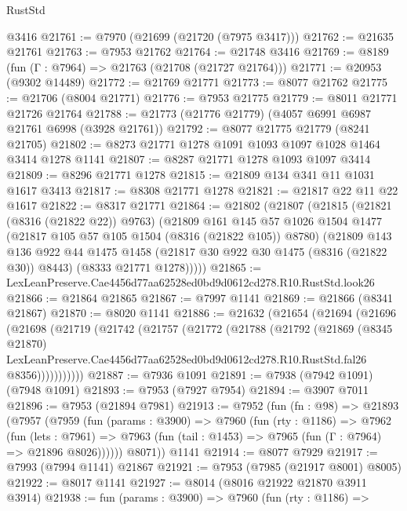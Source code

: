 \begin{lexlean}{RustStd}
\begin{coremodule}
    @3416
@21761 := @7970 (@21699 (@21720 (@7975 @3417)))
@21762 := @21635 @21761
@21763 := @7953 @21762
@21764 := @21748 @3416
@21769 := @8189 (fun (Γ : @7964) => @21763 (@21708 (@21727 @21764)))
@21771 := @20953 (@9302 @14489)
@21772 := @21769 @21771
@21773 := @8077 @21762
@21775 := @21706 (@8004 @21771)
@21776 := @7953 @21775
@21779 := @8011 @21771 @21726 @21764
@21788 := @21773 (@21776 @21779) (@4057 @6991 @6987 @21761 @6998 (@3928 @21761))
@21792 := @8077 @21775 @21779 (@8241 @21705)
@21802 := @8273 @21771 @1278 @1091 @1093 @1097 @1028 @1464 @3414 @1278 @1141
@21807 := @8287 @21771 @1278 @1093 @1097 @3414
@21809 := @8296 @21771 @1278
@21815 := @21809 @134 @341 @11 @1031 @1617 @3413
@21817 := @8308 @21771 @1278
@21821 := @21817 @22 @11 @22 @1617
@21822 := @8317 @21771
@21864 := @21802
    (@21807
      (@21815
        (@21821 (@8316 (@21822 @22)) @9763)
        (@21809
          @161
          @145
          @57
          @1026
          @1504
          @1477
          (@21817 @105 @57 @105 @1504 (@8316 (@21822 @105)) @8780)
          (@21809
            @143
            @136
            @922
            @44
            @1475
            @1458
            (@21817 @30 @922 @30 @1475 (@8316 (@21822 @30)) @8443)
            (@8333 @21771 @1278)))))
@21865 := LexLeanPreserve.Cae4456d77aa62528ed0bd9d0612cd278.R10.RustStd.look26
@21866 := @21864 @21865
@21867 := @7997 @1141
@21869 := @21866 (@8341 @21867)
@21870 := @8020 @1141
@21886 := @21632
    (@21654
      (@21694
        (@21696
          (@21698
            (@21719
              (@21742
                (@21757
                  (@21772
                    (@21788
                      (@21792
                        (@21869
                          (@8345 @21870)
                          LexLeanPreserve.Cae4456d77aa62528ed0bd9d0612cd278.R10.RustStd.fal26
                          @8356)))))))))))
@21887 := @7936 @1091
@21891 := @7938 (@7942 @1091) (@7948 @1091)
@21893 := @7953 (@7927 @7954)
@21894 := @3907 @7011
@21896 := @7953 (@21894 @7981)
@21913 := @7952
    (fun (fn : @98) =>
    @21893
      (@7957
        (@7959
          (fun (params : @3900) =>
          @7960
            (fun (rty : @1186) =>
            @7962
              (fun (lets : @7961) =>
              @7963 (fun (tail : @1453) => @7965 (fun (Γ : @7964) => @21896 @8026))))))
        @8071))
    @1141
@21914 := @8077 @7929
@21917 := @7993 (@7994 @1141) @21867
@21921 := @7953 (@7985 (@21917 @8001) @8005)
@21922 := @8017 @1141
@21927 := @8014 (@8016 @21922 @21870 @3911 @3914)
@21938 := fun (params : @3900) =>
  @7960
    (fun (rty : @1186) =>

\end{coremodule}
\end{lexlean}
